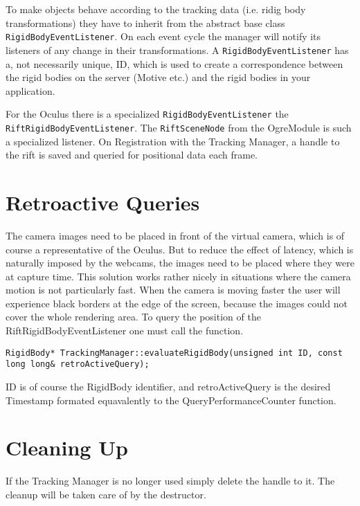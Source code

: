 To make objects behave according to the tracking data (i.e. ridig body transformations) they have to inherit from the abstract base class \texttt{RigidBodyEventListener}. On each event cycle the manager will notify its listeners of any change in their transformations. A \texttt{RigidBodyEventListener} has a, not necessarily unique, ID, which is used to create a correspondence between the rigid bodies on the server (Motive etc.) and the rigid bodies in your application.

For the Oculus there is a specialized \texttt{RigidBodyEventListener} the \texttt{\justify RiftRigidBodyEventListener}. The \texttt{RiftSceneNode} from the OgreModule is such a specialized listener. On Registration with the Tracking Manager, a handle to the rift is saved and queried for positional data each frame.


\section{Retroactive Queries}\label{retroactive-queries}

The camera images need to be placed in front of the virtual camera, which is of course a representative of the Oculus. But to reduce the effect of latency, which is naturally imposed by the webcams, the images need to be placed where they were at capture time. This solution works rather nicely in situations where the camera motion is not particularly fast. When the camera is moving faster the user will experience black borders at the edge of the screen, because the images could not cover the whole rendering area. To query the position of the RiftRigidBodyEventListener one must call the function.

\begin{lstlisting}
RigidBody* TrackingManager::evaluateRigidBody(unsigned int ID, const long long& retroActiveQuery);
\end{lstlisting}

ID is of course the RigidBody identifier, and retroActiveQuery is the desired Timestamp formated equavalently to the QueryPerformanceCounter function.

\section{Cleaning Up}\label{cleaning-up}

If the Tracking Manager is no longer used simply delete the handle to it. The cleanup will be taken care of by the destructor.